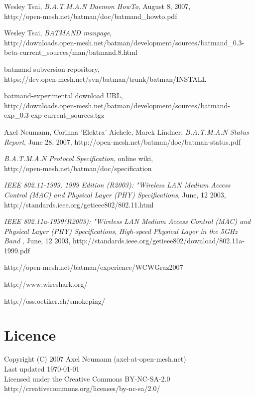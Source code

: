 \documentclass[11pt]{article}
\begin{document}
\begin{thebibliography}{1}

{Wesley Tsai},
{\it B.A.T.M.A.N Daemon HowTo}, {August 8, 2007},\\
{http://open-mesh.net/batman/doc/batmand\_howto.pdf}

{Wesley Tsai},
{\it BATMAND manpage},\\
{http://downloads.open-mesh.net/batman/development/sources/batmand\_0.3-beta-current\_sources/man/batmand.8.html}

{batmand subversion repository},\\
{https://dev.open-mesh.net/svn/batman/trunk/batman/INSTALL}

{batmand-experimental download URL},\\
{http://downloads.open-mesh.net/batman/development/sources/batmand-exp\_0.3-exp-current\_sources.tgz}


{Axel Neumann, Corinna 'Elektra' Aichele, Marek Lindner},
{\it B.A.T.M.A.N Status Report}, {June 28, 2007},
{http://open-mesh.net/batman/doc/batman-status.pdf}

{\it B.A.T.M.A.N Protocol Specification}, {online wiki},\\
{http://open-mesh.net/batman/doc/specification}


	{\it IEEE 802.11-1999, 1999 Edition (R2003): "Wireless LAN Medium
	Access Control (MAC) and Physical Layer (PHY) Specifications},
  {June, 12 2003},	
	http://standards.ieee.org/getieee802/802.11.html

	{\it IEEE 802.11a-1999(R2003): "Wireless LAN Medium Access Control (MAC) and Physical Layer (PHY) Specifications},
	{\it High-speed Physical Layer in the 5GHz Band },
  {June, 12 2003},	
	http://standards.ieee.org/getieee802/download/802.11a-1999.pdf

 http://open-mesh.net/batman/experience/WCWGraz2007 

 http://www.wireshark.org/

 http://oss.oetiker.ch/smokeping/


\end{thebibliography}

\section*{Licence}

Copyright (C) 2007 Axel Neumann (axel-at-open-mesh.net) \\
Last updated \today\\
Licensed under the Creative Commons BY-NC-SA-2.0 \\
http://creativecommons.org/licenses/by-nc-sa/2.0/
\end{document}

